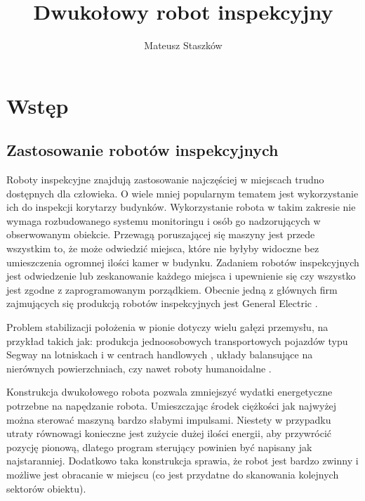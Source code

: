 \documentclass[a4paper,12pt,twoside,openany]{report}
\title{Dwukołowy robot inspekcyjny}
\author{Mateusz Staszków}
\begin{document}
\maketitle

\chapter{Wstęp}

\section{Zastosowanie robotów inspekcyjnych}

Roboty inspekcyjne znajdują zastosowanie najczęściej w miejscach trudno dostępnych dla człowieka. O wiele mniej popularnym tematem jest wykorzystanie ich do inspekcji korytarzy budynków. Wykorzystanie robota w takim zakresie nie wymaga rozbudowanego systemu monitoringu i osób go nadzorujących w obserwowanym obiekcie. Przewagą poruszającej się maszyny jest przede wszystkim to, że może odwiedzić miejsca, które nie byłyby widoczne bez umieszczenia ogromnej ilości kamer w budynku. Zadaniem robotów inspekcyjnych jest odwiedzenie lub zeskanowanie każdego miejsca i upewnienie się czy wszystko jest zgodne z zaprogramowanym porządkiem. Obecnie jedną z głównych firm zajmujących się produkcją robotów inspekcyjnych jest General Electric \cite{ge}. 

Problem stabilizacji położenia w pionie dotyczy wielu gałęzi przemysłu, na przykład takich jak: produkcja jednoosobowych transportowych pojazdów typu Segway na lotniskach i w centrach handlowych \cite{segway}, układy balansujące na nierównych powierzchniach, czy nawet roboty humanoidalne \cite{humanoid}. 

Konstrukcja dwukołowego robota pozwala zmniejszyć wydatki energetyczne potrzebne na napędzanie robota. Umieszczając środek ciężkości jak najwyżej można sterować maszyną bardzo słabymi impulsami. Niestety w przypadku utraty równowagi konieczne jest zużycie dużej ilości energii, aby przywrócić pozycję pionową, dlatego program sterujący powinien być napisany jak najstaranniej. Dodatkowo taka konstrukcja sprawia, że robot jest bardzo zwinny i możliwe jest obracanie w miejscu (co jest przydatne do skanowania kolejnych sektorów obiektu).
\end{document}
